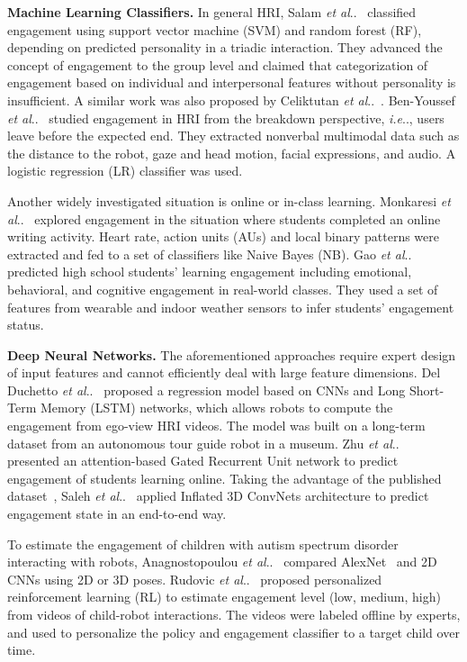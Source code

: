\documentclass[VANCOUVER,STIX1COL]{WileyNJD-v2}
\makeatletter
\DeclareRobustCommand\onedot{\futurelet\@let@token\@onedot}
\def\@onedot{\ifx\@let@token.\else.\null\fi\xspace}
\def\ie{\emph{i.e}\onedot}
\def\etal{\emph{et al}\onedot}
\makeatother
\begin{document}
\textbf{Machine Learning Classifiers.} In general HRI, Salam \etal~\cite{Salam2017Fully} classified engagement using support vector machine (SVM) and random forest (RF), depending on predicted personality in a triadic interaction. They advanced the concept of engagement to the group level and claimed that categorization of engagement based on individual and interpersonal features without personality is insufficient. A similar work was also proposed by Celiktutan \etal~\cite{Celiktutan2019Multimodal}. Ben-Youssef \etal~\cite{BenYoussef2019Early} studied engagement in HRI from the breakdown perspective, \ie, users leave before the expected end. They extracted nonverbal multimodal data such as the distance to the robot, gaze and head motion, facial expressions, and audio. A logistic regression (LR) classifier was used.

Another widely investigated situation is online or in-class learning. Monkaresi \etal~\cite{Monkaresi2017Automated} explored engagement in the situation where students completed an online writing activity. Heart rate, action units (AUs) and local binary patterns were extracted and fed to a set of classifiers like Naive Bayes (NB). Gao \etal~\cite{Gao2020NGage} predicted high school students' learning engagement including emotional, behavioral, and cognitive engagement in real-world classes. They used a set of features from wearable and indoor weather sensors to infer students' engagement status.

\textbf{Deep Neural Networks.} The aforementioned approaches require expert design of input features and cannot efficiently deal with large feature dimensions. Del Duchetto \etal~\cite{DelDuchetto2020Are} proposed a regression model based on CNNs and Long Short-Term Memory (LSTM) networks, which allows robots to compute the engagement from ego-view HRI videos. The model was built on a long-term dataset from an autonomous tour guide robot in a museum. Zhu \etal~\cite{Zhu2020Multirate} presented an attention-based Gated Recurrent Unit network to predict engagement of students learning online. Taking the advantage of the published dataset~\cite{BenYoussef2019Early}, Saleh \etal~\cite{Saleh2021Improving} applied Inflated 3D ConvNets architecture to predict engagement state in an end-to-end way.

To estimate the engagement of children with autism spectrum disorder interacting with robots, Anagnostopoulou \etal~\cite{Anagnostopoulou2021Engagement} compared AlexNet~\cite{Krizhevsky2012Imagenet} and 2D CNNs using 2D or 3D poses. Rudovic \etal~\cite{Rudovic2019Personalized} proposed personalized reinforcement learning (RL) to estimate engagement level (low, medium, high) from videos of child-robot interactions. The videos were labeled offline by experts, and used to personalize the policy and engagement classifier to a target child over time.
\end{document}
